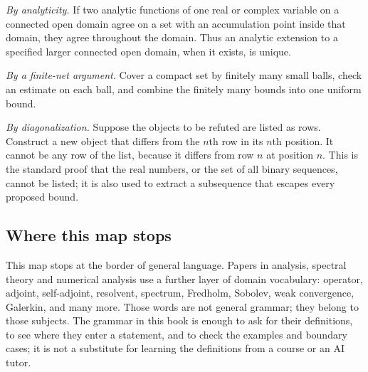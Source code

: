 \emph{By analyticity.} If two analytic functions of one real or complex variable on a connected open domain agree on a set with an accumulation point inside that domain, they agree throughout the domain. Thus an analytic extension to a specified larger connected open domain, when it exists, is unique.

\emph{By a finite-net argument.} Cover a compact set by finitely many small balls, check an estimate on each ball, and combine the finitely many bounds into one uniform bound.

\emph{By diagonalization.} Suppose the objects to be refuted are listed as rows. Construct a new object that differs from the $n$th row in its $n$th position. It cannot be any row of the list, because it differs from row $n$ at position $n$. This is the standard proof that the real numbers, or the set of all binary sequences, cannot be listed; it is also used to extract a subsequence that escapes every proposed bound.

\subsection*{Where this map stops}
This map stops at the border of general language. Papers in analysis, spectral theory and numerical analysis use a further layer of domain vocabulary: operator, adjoint, self-adjoint, resolvent, spectrum, Fredholm, Sobolev, weak convergence, Galerkin, and many more. Those words are not general grammar; they belong to those subjects. The grammar in this book is enough to ask for their definitions, to see where they enter a statement, and to check the examples and boundary cases; it is not a substitute for learning the definitions from a course or an AI tutor.
